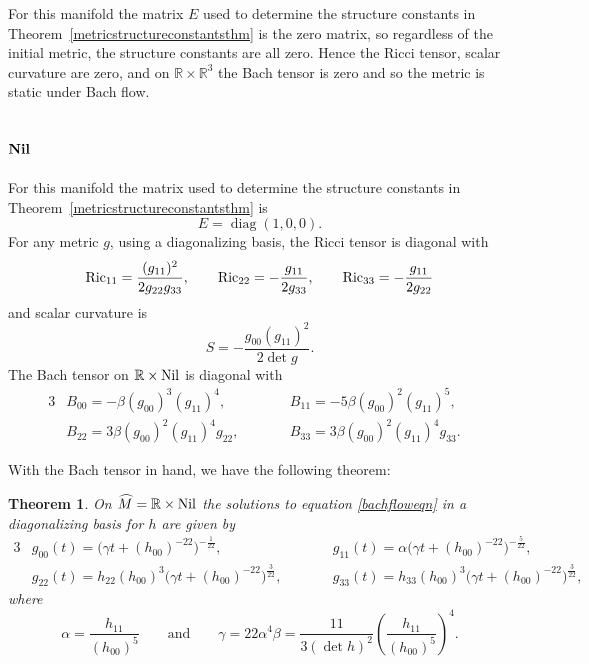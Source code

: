 \documentclass[10pt,a4paper]{amsart}
\numberwithin{equation}{section}
\newtheorem{Theorem}{Theorem}[section]
\newcommand{\diag}{\operatorname{diag}} %
\begin{document}
For this manifold the matrix $E$ used to determine the structure constants in Theorem~\ref{metricstructureconstantsthm} is the zero matrix, so regardless of the initial metric, the structure constants are all zero. Hence the Ricci tensor, scalar curvature are zero, and on $\mathbb{R} \times \mathbb{R}^3$ the Bach tensor is zero and so the metric is static under Bach flow.

\subsection[${\rm Nil}$]{$\boldsymbol{{\rm Nil}}$}

For this manifold the matrix used to determine the structure constants in Theorem~\ref{metricstructureconstantsthm} is
\[
E = \diag(1, 0, 0).
\]
For any metric $g$, using a diagonalizing basis, the Ricci tensor is diagonal with
\begin{gather*}
{\rm Ric}_{11} = \frac{(g_{11})^2}{2 g_{22} g_{33}},\qquad
{\rm Ric}_{22} = -\frac{g_{11}}{2 g_{33}},\qquad
{\rm Ric}_{33} = -\frac{g_{11}}{2 g_{22}}
\end{gather*}
and scalar curvature is
\[
S = -\frac{g_{00} (g_{11})^2}{2 \det g} .
\]
The Bach tensor on $\mathbb{R} \times {\rm Nil}$ is diagonal with
\begin{alignat*}{3}
& B_{00} = -\beta (g_{00})^3 (g_{11})^4, \qquad &&
B_{11} = -5 \beta (g_{00})^2 (g_{11})^5,&\\
& B_{22} = 3 \beta (g_{00})^2 (g_{11})^4 g_{22}, \qquad &&
B_{33} = 3 \beta (g_{00})^2 (g_{11})^4 g_{33}.&
\end{alignat*}

With the Bach tensor in hand, we have the following theorem:

\begin{Theorem} On $\widehat{M} = \mathbb{R} \times {\rm Nil}$ the solutions to equation \eqref{bachfloweqn} in a diagonalizing basis for $h$ are given by
\begin{alignat*}{3}
& g_{00}(t) = \big(\gamma t + (h_{00})^{-22} \big)^{-\frac{1}{22}}, \qquad &&
g_{11}(t) = \alpha \big(\gamma t + (h_{00})^{-22} \big)^{-\frac{5}{22}},& \\
& g_{22}(t) = h_{22} (h_{00})^{3}
		\big(\gamma t + (h_{00})^{-22} \big)^{\frac{3}{22}}, \qquad &&
g_{33}(t) = h_{33} (h_{00})^{3}
		\big(\gamma t + (h_{00})^{-22} \big)^{\frac{3}{22}},&
\end{alignat*}
where
\[
\alpha = \frac{h_{11}}{(h_{00})^5} \qquad \text{and} \qquad
\gamma = 22 \alpha^4 \beta
		= \frac{11}{3 (\det h)^2} \left(\frac{h_{11}}{(h_{00})^5}\right)^4.
\]
\end{Theorem}
\end{document}
